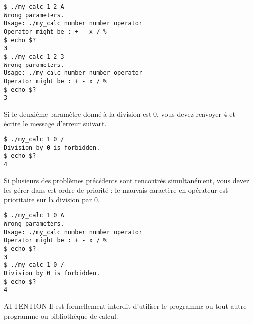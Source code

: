 \noindent {}

\bigskip

\lstset{language=sh}
\begin{lstlisting}[frame=single,title={Cas d'erreur 1 : mauvais paramètres}]
$ ./my_calc 1 2 A
Wrong parameters.
Usage: ./my_calc number number operator
Operator might be : + - x / %
$ echo $?
3
$ ./my_calc 1 2 3
Wrong parameters.
Usage: ./my_calc number number operator
Operator might be : + - x / %
$ echo $?
3
\end{lstlisting}

\bigskip

\noindent Si le deuxième paramètre donné à la division est 0, vous devez renvoyer 4 et écrire le message d'erreur suivant.

\bigskip

\noindent {}

\bigskip

\lstset{language=sh}
\begin{lstlisting}[frame=single,title={Cas d'erreur 2 : division par 0}]
$ ./my_calc 1 0 /
Division by 0 is forbidden.
$ echo $?
4
\end{lstlisting}

\bigskip

\noindent Si plusieurs des problèmes précédents sont rencontrés simultanément, vous devez les gérer dans cet ordre de priorité : le mauvais caractère en opérateur est prioritaire sur la division par 0.

\vfillLast
\clearpage

\lstset{language=sh}
\begin{lstlisting}[frame=single,title={Cas d'erreurs : ordre des erreurs}]
$ ./my_calc 1 0 A
Wrong parameters.
Usage: ./my_calc number number operator
Operator might be : + - x / %
$ echo $?
3
$ ./my_calc 1 0 /
Division by 0 is forbidden.
$ echo $?
4
\end{lstlisting}

\bigskip

\begin{RedBoxTitle}{ATTENTION}
    Il est formellement interdit d'utiliser le programme  ou tout autre programme ou bibliothèque de calcul.
\end{RedBoxTitle}